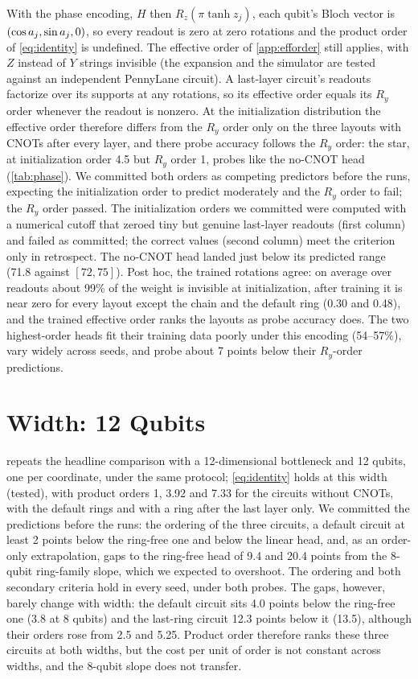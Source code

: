 With the phase encoding, $H$ then $R_z(\pi\tanh z_j)$, each qubit's Bloch vector is
$(\cos a_{j},\sin a_{j},0)$, so every readout is zero at zero rotations and the product order of
\cref{eq:identity} is undefined. The effective order of \cref{app:efforder} still applies, with
$Z$ instead of $Y$ strings invisible (the expansion and the simulator are tested against an
independent PennyLane circuit). A last-layer circuit's readouts factorize over its supports at any rotations,
so its effective order equals its $R_y$ order whenever the readout is nonzero. At the initialization
distribution the effective order therefore differs from the $R_y$ order only on the three layouts with
CNOTs after every layer, and there probe accuracy follows the $R_y$ order: the star, at initialization
order 4.5 but $R_y$ order 1, probes like the no-CNOT head (\cref{tab:phase}). We committed both
orders as competing predictors before the runs, expecting the initialization order to predict
moderately and the $R_y$ order to fail; the $R_y$ order passed. The initialization orders we committed
were computed with a numerical cutoff that zeroed tiny but genuine last-layer readouts (first column)
and failed as committed; the correct values (second column) meet the criterion only in retrospect. The
no-CNOT head landed just below its predicted range (71.8 against $[72,75]$). Post hoc, the trained
rotations agree: on average over readouts about 99\% of the weight is invisible at initialization,
after training it is near zero for every layout except the chain and the default ring (0.30 and 0.48),
and the trained effective order ranks the layouts as probe accuracy does. The two highest-order heads
fit their training data poorly under this encoding (54--57\%), vary widely across seeds, and probe
about 7 points below their $R_y$-order predictions.



\section{Width: 12 Qubits}
\label{app:width}

 repeats the headline comparison with a 12-dimensional bottleneck and 12 qubits, one
per coordinate, under the same protocol; \cref{eq:identity} holds at this width (tested), with product
orders 1, 3.92 and 7.33 for the circuits without CNOTs, with the default rings and with a ring after
the last layer only. We committed the predictions before the runs: the ordering of the three circuits,
a default circuit at least 2 points below the ring-free one and below the linear head, and, as an
order-only extrapolation, gaps to the ring-free head of 9.4 and 20.4 points from the 8-qubit
ring-family slope, which we expected to overshoot. The ordering and both secondary criteria hold in
every seed, under both probes. The gaps, however, barely change with width: the default circuit sits
4.0 points below the ring-free one (3.8 at 8 qubits) and the last-ring circuit 12.3 points below it
(13.5), although their orders rose from 2.5 and 5.25. Product order therefore ranks these three circuits at both widths, but the cost
per unit of order is not constant across widths, and the 8-qubit slope does not transfer.

